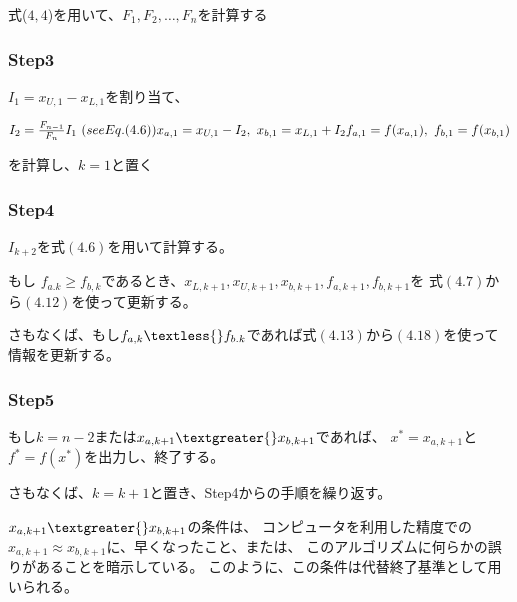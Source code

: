 式($4,4$)を用いて、$F_1, F_2, \dots ,
F_n$を計算する

\subsubsection*{Step3}\label{step3}

$I_1 = x_{U,1} -x_{L,1}$を割り当て、

$ I_2 = \frac{F_{n-1}}{F_n} I_1
\ \text(see Eq. (4.6))
\\ x_{a,1} = x_{U,1} - I_2,
\ x_{b,1} = x_{L,1} + I_2
\\ f_{a,1} = f(x_{a,1}),
\ f_{b,1} = f(x_{b,1}) $

を計算し、$k = 1$と置く

\subsubsection*{Step4}\label{step4}

$I_{k+2}$を式$(4.6)$を用いて計算する。

もし $f_{a.k} \geq
f_{b,k}$であるとき、$x_{L,k+1},x_{U,k+1},x_{b,k+1},f_{a,k+1},f_{b,k+1}$を
式$(4.7)$から$(4.12)$を使って更新する。

さもなくば、もし$f_{a,k} \textless{}
f_{b.k}$であれば式$(4.13)$から$(4.18)$を使って情報を更新する。

\subsubsection*{Step5}\label{step5}

もし$k = n - 2$または$x_{a,k+1} \textgreater{}
x_{b,k+1}$であれば、 $x^\ast =
x_{a,k+1}$と$f^\ast =
f(x^\ast)$を出力し、終了する。

さもなくば、$k = k + 1$と置き、Step4からの手順を繰り返す。

$x_{a,k+1} \textgreater{} x_{b,k+1}$の条件は、
コンピュータを利用した精度での$x_{a,k+1} \approx
x_{b,k+1}$に、早くなったこと、または、
このアルゴリズムに何らかの誤りがあることを暗示している。
このように、この条件は代替終了基準として用いられる。
